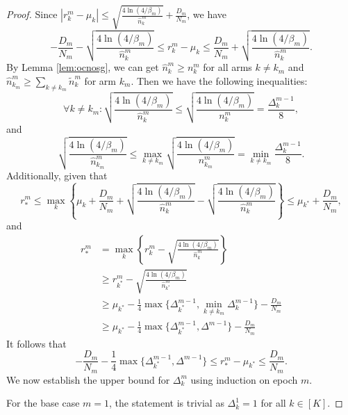 \begin{proof}
    Since $|r_k^m - \mu_k| \leq \sqrt{\frac{4\ln(4 /\beta_m)}{\hat{n}_k^m}} + \frac{D_m}{N_m}$, we have
    \[-\frac{D_m}{N_m} - \sqrt{\frac{4\ln(4 /\beta_m)}{\hat{n}_k^m}} \leq r_{k}^m - \mu_{k} \leq \frac{D_m}{N_m} + \sqrt{\frac{4\ln(4 /\beta_m)}{\hat{n}_k^m}}.\]
    By Lemma \ref{lem:ocnosg}, we can get $\hat{n}_k^m \geq n_k^m$ for all arms $k \neq k_m$ and $\hat{n}_{k_m}^m \geq \sum_{k \neq k_m} \widetilde{n}_k^m$ for arm $k_m$. Then we have the following inequalities:
    \[\forall k \neq k_m: \sqrt{\frac{4\ln(4/\beta_m)}{\hat{n}_k^m}} \leq \sqrt{\frac{4\ln(4/\beta_m)}{n_k^m}} = \frac{\Delta_k^{m-1}}{8},\]
    and
    \[\sqrt{\frac{4\ln(4/\beta_m)}{\hat{n}_{k_m}^m}} \leq \max_{k \neq k_m}\sqrt{\frac{4\ln(4/\beta_m)}{n_{k_m}^m}} = \min_{k \neq k_m}\frac{\Delta_k^{m-1}}{8}.\]
    Additionally, given that
    \[r_{*}^m \leq \max_k \left\{\mu_{k} + \frac{D_m}{N_m} + \sqrt{\frac{4\ln(4 /\beta_m)}{\hat{n}_k^m}} - \sqrt{\frac{4\ln(4 /\beta_m)}{\hat{n}_k^m}}\right\} \leq \mu_{k^*} + \frac{D_m}{N_m},\]
    and
    \begin{equation*}
        \begin{split}
        r_{*}^m &= \max_k \left\{r_k^m - \sqrt{\frac{4\ln(4/\beta_m)}{\hat{n}_k^m}}\right\} \\
        &\geq r_{k^*}^m - \sqrt{\frac{4\ln(4/\beta_m)}{\hat{n}_{k^*}^m}} \\
        &\geq \mu_{k^*} - \frac{1}{4}\max \{\Delta_{k^*}^{m-1}, \min_{k \neq k_m}\Delta_{k}^{m-1}\} - \frac{D_m}{N_m} \\
        &\geq \mu_{k^*} - \frac{1}{4}\max \{\Delta_{k^*}^{m-1}, \Delta^{m-1}\} - \frac{D_m}{N_m}
        \end{split}
    \end{equation*}
    It follows that
    \[-\frac{D_m}{N_m} - \frac{1}{4}\max \{\Delta_{k^*}^{m-1}, \Delta^{m-1}\} \leq r_{*}^m - \mu_{k^*} \leq \frac{D_m}{N_m}.\]
    We now establish the upper bound for $\Delta_k^m$ using induction on epoch $m$.
    
    For the base case $m = 1$, the statement is trivial as $\Delta_k^1 = 1$ for all $k \in [K]$.


\end{proof}
